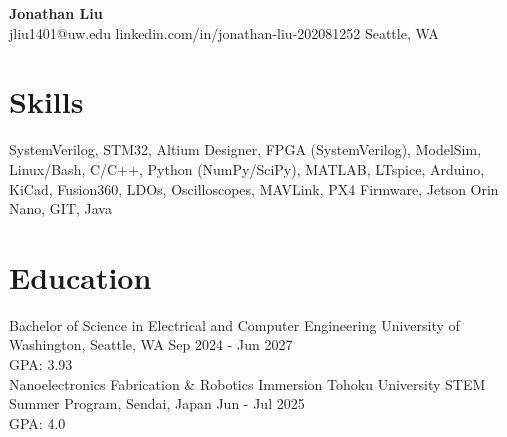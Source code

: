 \documentclass[11pt,letterpaper]{article}
\begin{document}
\begin{center}
{\LARGE \textbf{Jonathan Liu}}\\[2pt]
\small jliu1401@uw.edu \textbullet{} linkedin.com/in/jonathan-liu-202081252 \textbullet{} Seattle, WA
\end{center}
\section*{Skills}
SystemVerilog, STM32, Altium Designer, FPGA (SystemVerilog), ModelSim, Linux/Bash, C/C++, Python (NumPy/SciPy), MATLAB, LTspice, Arduino, KiCad, Fusion360, LDOs, Oscilloscopes, MAVLink, PX4 Firmware, Jetson Orin Nano, GIT, Java
\section*{Education}
\noindent Bachelor of Science in Electrical and Computer Engineering \textbar{} University of Washington, Seattle, WA \textbar{} Sep 2024 - Jun 2027\\
GPA: 3.93\\
\noindent Nanoelectronics Fabrication \& Robotics Immersion \textbar{} Tohoku University STEM Summer Program, Sendai, Japan \textbar{} Jun - Jul 2025\\
GPA: 4.0\\
\end{document}
